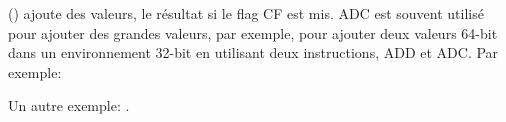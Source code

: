   \item[ADC] ()
  ajoute des valeurs,  le résultat si le flag CF est
  mis. ADC est souvent utilisé pour ajouter des grandes valeurs, par exemple, pour
  ajouter deux valeurs 64-bit dans un environnement 32-bit en utilisant deux
  instructions, ADD et ADC. Par exemple:



Un autre exemple: .
